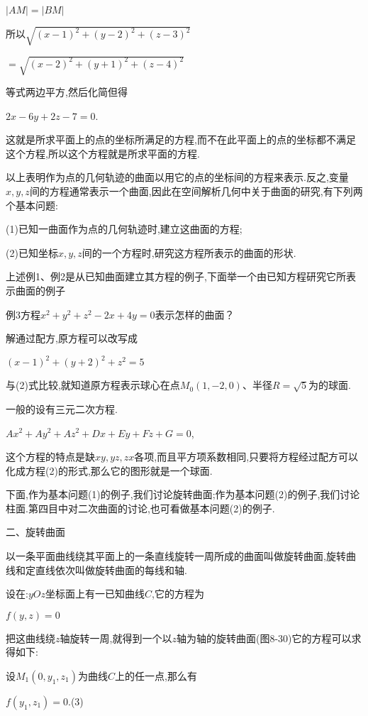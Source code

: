 \documentclass[oneside]{book}
\begin{document}
$\left| {AM} \right| = \left| {BM} \right|$

所以$\sqrt{(x-1)^{2}+(y-2)^{2}+(z-3)^{2}}$

\quad \quad $=\sqrt{(x-2)^{2}+(y+1)^{2}+(z-4)^{2}}$

等式两边平方,然后化简但得

$2x - 6y + 2z - 7 = 0$.

这就是所求平面上的点的坐标所满足的方程,而不在此平面上的点的坐标都不满足这个方程,所以这个方程就是所求平面的方程.

以上表明作为点的几何轨迹的曲面以用它的点的坐标间的方程来表示.反之,变量$x,y,z$间的方程通常表示一个曲面,因此在空间解析几何中关于曲面的研究,有下列两个基本问题:

(1)已知一曲面作为点的几何轨迹时,建立这曲面的方程;

(2)已知坐标$x,y,z$间的一个方程时,研究这方程所表示的曲面的形状.

上述例1、例2是从已知曲面建立其方程的例子,下面举一个由已知方程研究它所表示曲面的例子

例3方程${x^2} + {y^2} + {z^2} - 2x + 4y = 0$表示怎样的曲面？

解通过配方,原方程可以改写成

${\left( {x - 1} \right)^2} + {\left( {y + 2} \right)^2} + {z^2} = 5$

与(2)式比较,就知道原方程表示球心在点${M_0}(1, - 2,0)$、半径$R = \sqrt 5 $为的球面.

一般的设有三元二次方程.

$A{x^2} + A{y^2} + A{z^2} + Dx + Ey + Fz + G = 0$,

这个方程的特点是缺$xy,yz,zx$各项,而且平方项系数相同,只要将方程经过配方可以化成方程(2)的形式,那么它的图形就是一个球面.

下面,作为基本问题(1)的例子,我们讨论旋转曲面;作为基本问题(2)的例子,我们讨论柱面.第四目中对二次曲面的讨论,也可看做基本问题(2)的例子.

二、旋转曲面

以一条平面曲线绕其平面上的一条直线旋转一周所成的曲面叫做旋转曲面,旋转曲线和定直线依次叫做旋转曲面的每线和轴.

设在:$yOz$坐标面上有一已知曲线$C$,它的方程为

$f\left( {y,z} \right) = 0$

把这曲线绕$z$轴旋转一周,就得到一个以$z$轴为轴的旋转曲面(图8-30)它的方程可以求得如下:

设${M_1}(0,{y_1},{z_1})$为曲线$C$上的任一点,那么有

$f\left( {{y_1},{z_1}} \right) = 0$.(3)
\end{document}

